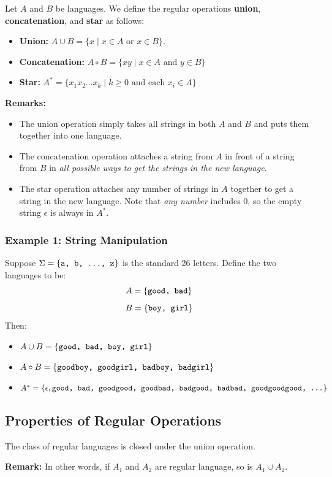 \documentclass[letterpaper]{article}
\begin{document}
\begin{definition}{}{}
    Let $A$ and $B$ be languages. We define the regular operations \textbf{union}, \textbf{concatenation}, and \textbf{star} as follows: 
    \begin{itemize}
        \item \textbf{Union:} $A \cup B = \{x \mid x \in A \text{ or } x \in B\}$.
        \item \textbf{Concatenation:} $A \circ B = \{xy \mid x \in A \text{ and } y \in B\}$
        \item \textbf{Star:} $A^* = \{x_1 x_2 \dots x_k \mid k \geq 0 \text{ and each } x_i \in A\}$
    \end{itemize}
\end{definition}
\textbf{Remarks:}
\begin{itemize}
    \item The union operation simply takes all strings in both $A$ and $B$ and puts them together into one language.
    \item The concatenation operation attaches a string from $A$ in front of a string from $B$ in \emph{all possible ways to get the strings in the new language}.
    \item The star operation attaches any number of strings in $A$ together to get a string in the new language. Note that \emph{any number} includes 0, so the empty string $\epsilon$ is always in $A^*$.
\end{itemize}

\subsubsection{Example 1: String Manipulation}
Suppose $\Sigma = \{\texttt{a, b, ..., z}\}$ is the standard 26 letters. Define the two languages to be:
\[A = \{\texttt{good, bad}\}\]
\[B = \{\texttt{boy, girl}\}\]
Then: 
\begin{itemize}
    \item $A \cup B = \{\texttt{good, bad, boy, girl}\}$
    \item $A \circ B = \{\texttt{goodboy, goodgirl, badboy, badgirl}\}$
    \item $A^* = \{\epsilon, \texttt{good, bad, goodgood, goodbad, badgood, badbad, goodgoodgood, ...}\}$
\end{itemize}

\subsection{Properties of Regular Operations}
\begin{theorem}{}{}
    The class of regular languages is closed under the union operation.
\end{theorem}
\textbf{Remark:} In other words, if $A_1$ and $A_2$ are regular language, so is $A_1 \cup A_2$.
\end{document}
